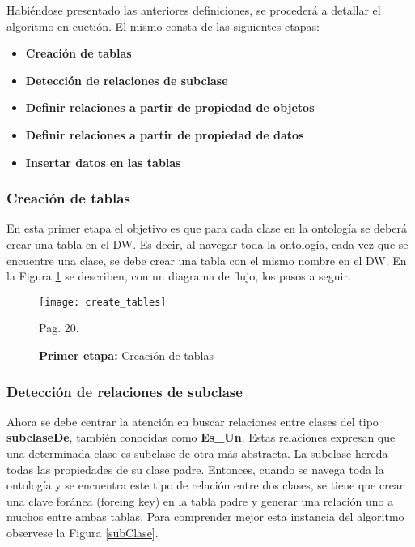 \documentclass[a4paper,11pt]{article}
\begin{document}
    
    Habiéndose presentado las anteriores definiciones, se procederá a detallar el algoritmo en cuetión. El mismo consta de las siguientes etapas:
    
    \begin{itemize}
      \item \textbf{Creación de tablas}
      \item \textbf{Detección de relaciones de subclase}
      \item \textbf{Definir relaciones a partir de propiedad de objetos}
      \item \textbf{Definir relaciones a partir de propiedad de datos}
      \item \textbf{Insertar datos en las tablas}
    \end{itemize} 
    
    \subsubsection{Creación de tablas}
    
    En esta primer etapa el objetivo es que para cada clase en la ontología se deberá crear una tabla en el DW. Es decir, al navegar toda la ontología,
    cada vez que se encuentre una clase, se debe crear una tabla con el mismo nombre en el DW. En la Figura \ref{createTables} se describen, con un
    diagrama de flujo, los pasos a seguir.
    
    \begin{figure}
      \begin{center}
        \texttt{[image: create\_tables]}
        \caption{\textbf{Primer etapa:} Creación de tablas} \cite{ontologias} Pag. 20.
        \label{createTables}
      \end{center}
    \end{figure}
    
    \subsubsection{Detección de relaciones de subclase}
     
    Ahora se debe centrar la atención en buscar relaciones entre clases del tipo \textbf{subclaseDe}, también conocidas como \textbf{Es\_Un}. Estas
    relaciones expresan que una determinada clase es subclase de otra más abstracta. La subclase hereda todas las propiedades de su clase padre.
    Entonces, cuando se navega toda la ontología y se encuentra este tipo de relación entre dos clases, se tiene que crear una clave foránea (foreing
    key) en la tabla padre y generar una relación uno a muchos entre ambas tablas. Para comprender mejor esta instancia del algoritmo observese la
    Figura \ref{subClase}.
   
\end{document}
